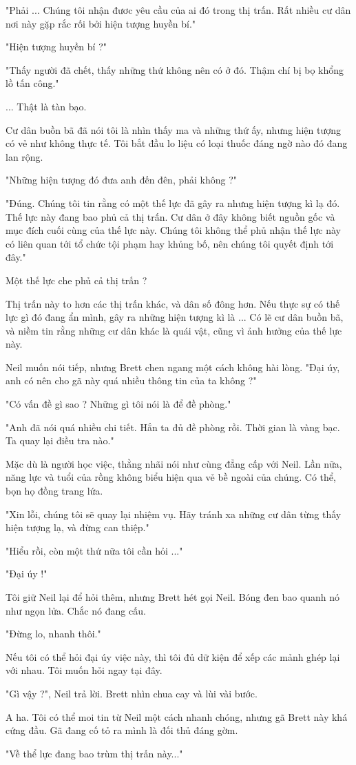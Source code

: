 "Phải ... Chúng tôi nhận đươc yêu cầu của ai đó trong thị trấn. Rất nhiều cư dân nơi này gặp rắc rối bởi hiện tượng huyền bí."

"Hiện tượng huyền bí ?"

"Thấy người đã chết, thấy những thứ không nên có ở đó. Thậm chí bị bọ khổng lồ tấn công."

... Thật là tàn bạo.

Cư dân buồn bã đã nói tôi là nhìn thấy ma và những thứ ấy, nhưng hiện tượng có vẻ như không thực tế. Tôi bắt đầu lo liệu có loại thuốc đáng ngờ nào đó đang lan rộng.

"Những hiện tượng đó đưa anh đến đên, phải không ?"

"Đúng. Chúng tôi tin rằng có một thế lực đã gây ra nhưng hiện tượng kì lạ đó. Thế lực này đang bao phủ cả thị trấn. Cư dân ở đây không biết nguồn gốc và mục đích cuối cùng của thế lực này. Chúng tôi không thể phủ nhận thế lực này có liên quan tới tổ chức tội phạm hay khủng bố, nên chúng tôi quyết định tới đây."

Một thế lực che phủ cả thị trấn ?

Thị trấn này to hơn các thị trấn khác, và dân số đông hơn. Nếu thực sự có thế lực gì đó đang ẩn mình, gây ra những hiện tượng kì là ... Có lẽ cư dân buồn bã, và niềm tin rằng những cư dân khác là quái vật, cũng vì ảnh hưởng của thế lực này.

Neil muốn nói tiếp, nhưng Brett chen ngang một cách không hài lòng. "Đại úy, anh có nên cho gã này quá nhiều thông tin của ta không ?"

"Có vấn đề gì sao ? Những gì tôi nói là để đề phòng."

"Anh đã nói quá nhiều chi tiết. Hắn ta đủ đề phòng rồi. Thời gian là vàng bạc. Ta quay lại điều tra nào."

Mặc dù là người học việc, thằng nhãi nói như cùng đẳng cấp với Neil. Lần nữa, năng lực và tuổi của rồng không biểu hiện qua vẻ bề ngoài của chúng. Có thể, bọn họ đồng trang lứa.

"Xin lỗi, chúng tôi sẽ quay lại nhiệm vụ. Hãy tránh xa những cư dân từng thấy hiện tượng lạ, và đừng can thiệp."

"Hiểu rồi, còn một thứ nữa tôi cần hỏi ..."

"Đại úy !"

Tôi giữ Neil lại để hỏi thêm, nhưng Brett hét gọi Neil. Bóng đen bao quanh nó như ngọn lửa. Chắc nó đang cấu.

"Đừng lo, nhanh thôi."

Nếu tôi có thể hỏi đại úy việc này, thì tôi đủ dữ kiện để xếp các mảnh ghép lại với nhau. Tôi muốn hỏi ngay tại đây.

"Gì vậy ?", Neil trả lời. Brett nhìn chua cay và lùi vài bước.

A ha. Tôi có thể moi tin từ Neil một cách nhanh chóng, nhưng gã Brett này khá cứng đầu. Gã đang cố tỏ ra mình là đối thủ đáng gờm.

"Về thể lực đang bao trùm thị trấn này..." \\


 